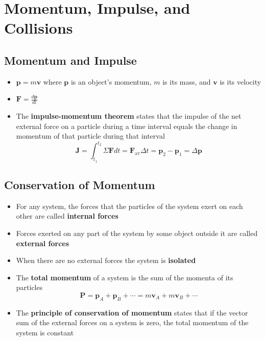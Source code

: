 \documentclass{article}
\begin{document}
\section{Momentum, Impulse, and Collisions}

\subsection{Momentum and Impulse}

\begin{itemize}
    \item $\mathbf{p}=m\mathbf{v}$ where $\mathbf{p}$ is an object's momentum, $m$ is its mass, and $\mathbf{v}$ is its velocity

    \item $\mathbf{F}=\frac{d\mathbf{p}}{dt}$

    \item The \textbf{impulse-momentum theorem} states that the impulse of the net external force on a particle during a time interval equals the change in momentum of that particle during that interval \[\mathbf{J}=\int_{t_1}^{t_2}\Sigma\mathbf{F}dt=\mathbf{F}_\textrm{av}\Delta t=\mathbf{p}_2-\mathbf{p}_1=\Delta\mathbf{p}\]
\end{itemize}

\subsection{Conservation of Momentum}

\begin{itemize}
    \item For any system, the forces that the particles of the system exert on each other are called \textbf{internal forces}

    \item Forces exerted on any part of the system by some object outside it are called \textbf{external forces}

    \item When there are no external forces the system is \textbf{isolated}

    \item The \textbf{total momentum} of a system is the sum of the momenta of its particles \[\mathbf{P}=\mathbf{p}_A+\mathbf{p}_B+\cdots=m\mathbf{v}_A+m\mathbf{v}_B+\cdots\]

    \item The \textbf{principle of conservation of momentum} states that if the vector sum of the external forces on a system is zero, the total momentum of the system is constant
\end{itemize}
\end{document}
